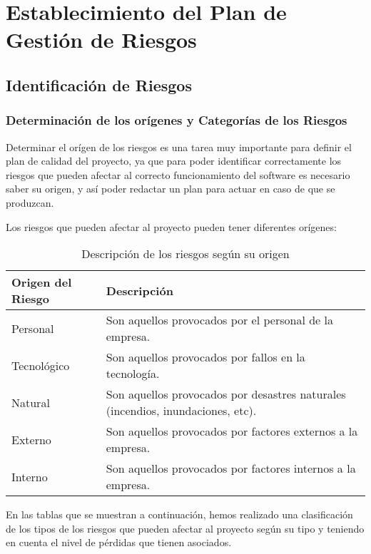 

\section{Establecimiento del Plan de Gestión de Riesgos}
\subsection{Identificación de Riesgos}
\subsubsection{Determinación de los orígenes y Categorías de los Riesgos}
\par Determinar el orígen de los riesgos es una tarea muy importante para definir el plan de calidad del proyecto, ya que para poder identificar correctamente los riesgos que pueden afectar al correcto funcionamiento del software es necesario saber su origen, y así poder redactar un plan para actuar en caso de que se produzcan.

\par Los riesgos que pueden afectar al proyecto pueden tener diferentes orígenes:






\begin{table}[h]
\begin{center}
\begin{tabular}{p{} p{11cm}}
\textbf{Origen del Riesgo} & \textbf{Descripción}\\ \hline
Personal & Son aquellos provocados por el personal de la empresa. \\
Tecnológico &  Son aquellos provocados por fallos en la tecnología.\\
Natural &  Son aquellos provocados por desastres naturales (incendios, inundaciones, etc).\\
Externo &  Son aquellos provocados por factores externos a la empresa.\\
Interno & Son aquellos provocados por factores internos a la empresa. \\ \hline
\end{tabular}
\caption{Descripción de los riesgos según su origen}
\label{origenRiesgos}
\end{center}
\end{table}




\par En las tablas que se muestran a continuación, hemos realizado una clasificación de los tipos de los riesgos que pueden afectar al proyecto según su tipo y teniendo en cuenta el nivel de pérdidas que tienen asociados.

